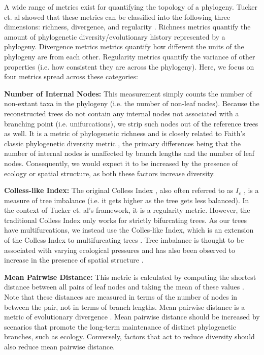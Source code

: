 A wide range of metrics exist for quantifying the topology of a phylogeny. Tucker et. al showed that these metrics can be classified into the following three dimensions: richness, divergence, and regularity \citep{tuckerGuidePhylogeneticMetrics2017}. 
Richness metrics quantify the amount of phylogenetic diversity/evolutionary history represented by a phylogeny. Divergence metrics metrics quantify how different the units of the phylogeny are from each other. Regularity metrics quantify the variance of other properties (i.e. how consistent they are across the phylogeny). Here, we focus on four metrics spread across these categories:

\textbf{Number of Internal Nodes:} This measurement simply counts the number of non-extant taxa in the phylogeny (i.e. the number of non-leaf nodes). Because the reconstructed trees do not contain any internal nodes not associated with a branching point (i.e. unifurcations), we strip such nodes out of the reference trees as well. It is a metric of phylogenetic richness and is closely related to Faith's classic phylogenetic diversity metric \citep{faithConservationEvaluationPhylogenetic1992}, the primary differences being that the number of internal nodes is unaffected by branch lengths and the number of leaf nodes. Consequently, we would expect it to be increased by the presence of ecology or spatial structure, as both these factors increase diversity.

\textbf{Colless-like Index:} The original Colless Index \citep{collessReviewPhylogeneticsTheory1982}, also often referred to as $I_c$ \citep{shaoTreeBalance1990}, is a measure of tree imbalance (i.e. it gets higher as the tree gets less balanced). In the context of Tucker et. al's framework, it is a regularity metric. However, the traditional Colless Index only works for strictly bifurcating trees. As our trees have multifurcations, we instead use the Colles-like Index, which is an extension of the Colless Index to multifurcating trees \citep{mirSoundCollesslikeBalance2018}. Tree imbalance is thought to be associated with varying ecological pressures \citep{chamberlainPhylogeneticTreeShape2014, burressEcologicalOpportunityAlters} and has also been observed to increase in the presence of spatial structure \citep{scottInferringTumorProliferative2020}.

\textbf{Mean Pairwise Distance:} This metric is calculated by computing the shortest distance between all pairs of leaf nodes and taking the mean of these values \citep{webbExploringPhylogeneticStructure2000}. Note that these distances are measured in terms of the number of nodes in between the pair, not in terms of branch lengths. Mean pairwise distance is a metric of evolutionary divergence \citep{tuckerGuidePhylogeneticMetrics2017}. Mean pairwise distance should be increased by scenarios that promote the long-term maintenance of distinct phylogenetic branches, such as ecology. Conversely, factors that act to reduce diversity should also reduce mean pairwise distance.

